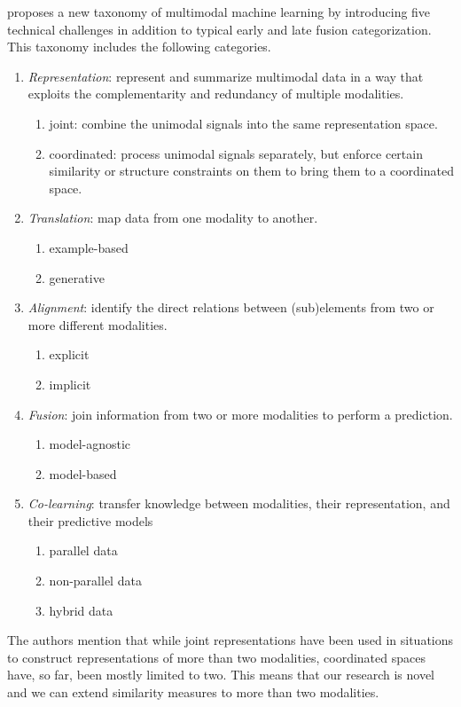 \documentclass[11pt]{article}
\begin{document}
\citet{baltrusaitisMultimodalMachineLearning2019} proposes a new taxonomy of multimodal machine learning by introducing five technical challenges in addition to typical early and late fusion categorization. This taxonomy includes the following categories.
\begin{enumerate}
\item \textit{Representation}: represent and summarize multimodal data in a way that exploits the complementarity and redundancy of multiple modalities.
\begin{enumerate}
\item joint: combine the unimodal signals into the same representation space.
\item coordinated: process unimodal signals separately, but enforce certain similarity or structure constraints on them to bring them to a coordinated space.
\end{enumerate}
\item \textit{Translation}: map data from one modality to another.
\begin{enumerate}
\item example-based
\item generative
\end{enumerate}
\item \textit{Alignment}: identify the direct relations between (sub)elements from two or more different modalities.
\begin{enumerate}
\item explicit
\item implicit
\end{enumerate}
\item \textit{Fusion}: join information from two or more modalities to perform a prediction.
\begin{enumerate}
\item model-agnostic
\item model-based
\end{enumerate}
\item \textit{Co-learning}: transfer knowledge between modalities, their representation, and their predictive models
\begin{enumerate}
\item parallel data
\item non-parallel data
\item hybrid data
\end{enumerate}
\end{enumerate}

The authors mention that while joint representations have been used in situations to construct representations of more than two modalities, coordinated spaces have, so far, been mostly limited to two. This means that our research is novel and we can extend similarity measures to more than two modalities.
\end{document}
